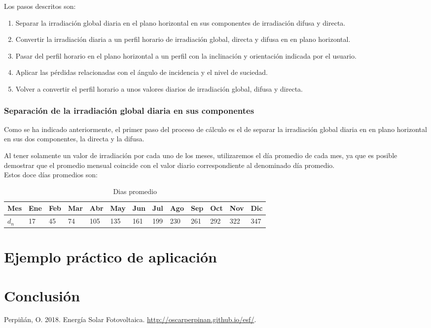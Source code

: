 \documentclass[11pt]{report}
\begin{document}
Los pasos descritos son:
\begin{enumerate}
	\item Separar la irradiación global diaria en el plano horizontal en sus componentes de irradiación difusa y directa.
	\item Convertir la irradiación diaria a un perfil horario de irradiación global, directa y difusa en en plano horizontal.
	\item Pasar del perfil horario en el plano horizontal a un perfil con la inclinación y orientación indicada por el usuario.
	\item Aplicar las pérdidas relacionadas con el ángulo de incidencia y el nivel de suciedad.
	\item Volver a convertir el perfil horario a unos valores diarios de irradiación global, difusa y directa.
\end{enumerate}

\subsection{Separación de la irradiación global diaria en sus componentes}

Como se ha indicado anteriormente, el primer paso del proceso de cálculo es el de separar la irradiación global diaria en en plano horizontal en sus dos componentes, la directa y la difusa.

Al tener solamente un valor de irradiación por cada uno de los meses, utilizaremos el día promedio de cada mes, ya que es posible demostrar que el promedio mensual coincide con el valor diario correspondiente al denominado día promedio.\\

Estos doce días promedios son:

\begin{table}[ht]
\centering
\begin{tabular}{|l|l|l|l|l|l|l|l|l|l|l|l|l|}
\hline
Mes   & Ene & Feb & Mar & Abr & May & Jun & Jul & Ago & Sep & Oct & Nov & Dic \\ \hline
$d_n$ & 17  & 45  & 74  & 105  & 135  & 161  & 199  & 230  & 261  & 292  & 322 & 347  \\ \hline
\end{tabular}
\label{tab:dias_promedio}
\caption{Dias promedio}
\end{table}

\chapter{Ejemplo práctico de aplicación}

\chapter{Conclusión}


\pagebreak

\begin{thebibliography}{99}
 Perpiñán, O. 2018. Energía Solar Fotovoltaica. \url{http://oscarperpinan.github.io/esf/}. 
\end{thebibliography}
\end{document}
